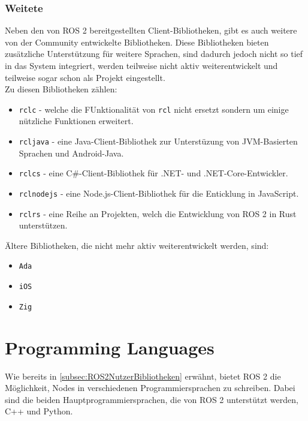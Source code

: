\subsubsection{Weitete}\label{subsubsec:ROS2Weitete}
Neben den von \ac{ROS} 2 bereitgestellten Client-Bibliotheken, gibt es auch weitere von der Community entwickelte Bibliotheken. Diese Bibliotheken bieten zusätzliche Unterstützung für weitere Sprachen, sind dadurch jedoch nicht so tief in das System integriert, werden teilweise nicht aktiv weiterentwickelt und teilweise sogar schon als Projekt eingestellt.\\
Zu diesen Bibliotheken zählen:\\
\begin{itemize}
    \item \texttt{rclc} - welche die FUnktionalität von \texttt{rcl} nicht ersetzt sondern um einige nützliche Funktionen erweitert.\\
    \item \texttt{rcljava} - eine Java-Client-Bibliothek zur Unterstüzung von \ac{JVM}-Basierten Sprachen und Android-Java.\\
    \item \texttt{rclcs} - eine C\#-Client-Bibliothek für .NET- und .NET-Core-Entwickler.\\
    \item \texttt{rclnodejs} - eine Node.js-Client-Bibliothek für die Enticklung in JavaScript.\\
    \item \texttt{rclrs} - eine Reihe an Projekten, welch die Entwicklung von \ac{ROS} 2 in Rust unterstützen.\\
\end{itemize}
Ältere Bibliotheken, die nicht mehr aktiv weiterentwickelt werden, sind:\\
\begin{itemize}
    \item \texttt{Ada}
    \item \texttt{iOS}
    \item \texttt{Zig}
\end{itemize}


\section{Programming Languages}
Wie bereits in \autoref{subsec:ROS2NutzerBibliotheken} erwähnt, bietet \ac{ROS} 2 die Möglichkeit, Nodes in verschiedenen Programmiersprachen zu schreiben. Dabei sind die beiden Hauptprogrammiersprachen, die von \ac{ROS} 2 unterstützt werden, C++ und Python.\\

